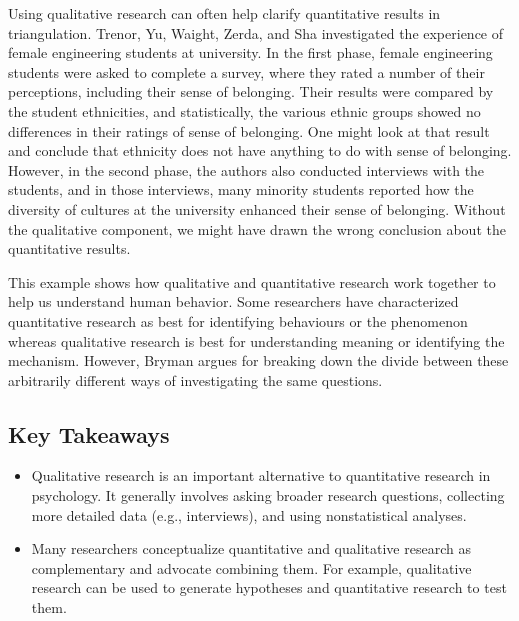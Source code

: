 Using qualitative research can often help clarify quantitative results in triangulation. Trenor, Yu, Waight, Zerda, and Sha \citeyear{trenor_relations_2008} investigated the experience of female engineering students at university. In the first phase, female engineering students were asked to complete a survey, where they rated a number of their perceptions, including their sense of belonging. Their results were compared by the student ethnicities, and statistically, the various ethnic groups showed no differences in their ratings of sense of belonging. One might look at that result and conclude that ethnicity does not have anything to do with sense of belonging. However, in the second phase, the authors also conducted interviews with the students, and in those interviews, many minority students reported how the diversity of cultures at the university enhanced their sense of belonging. Without the qualitative component, we might have drawn the wrong conclusion about the quantitative results.

This example shows how qualitative and quantitative research work together to help us understand human behavior. Some researchers have characterized quantitative research as best for identifying behaviours or the phenomenon whereas qualitative research is best for understanding meaning or identifying the mechanism. However, Bryman \citeyear{bryman_social_2015} argues for breaking down the divide between these arbitrarily different ways of investigating the same questions.


\subsection{Key Takeaways}

\begin{fullwidth}

\begin{itemize}


\item Qualitative research is an important alternative to quantitative research in psychology. It generally involves asking broader research questions, collecting more detailed data (e.g., interviews), and using nonstatistical analyses.

\item Many researchers conceptualize quantitative and qualitative research as complementary and advocate combining them. For example, qualitative research can be used to generate hypotheses and quantitative research to test them.


\end{itemize}

\end{fullwidth}



